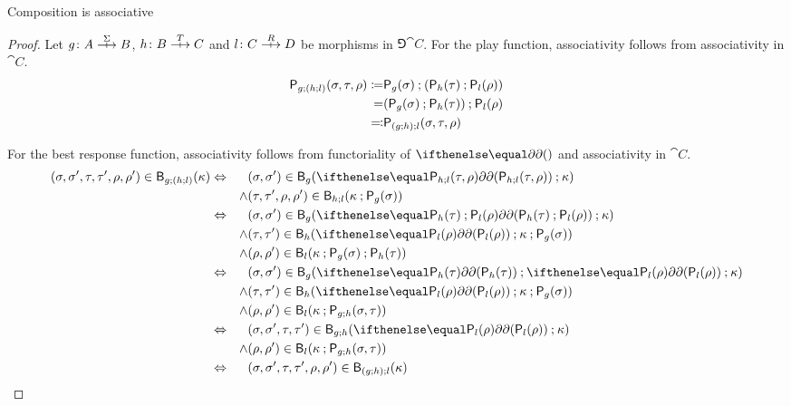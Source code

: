 \begin{lemma}
  Composition is associative
\end{lemma}
\begin{proof}
  Let \(g \colon A \gamearrow{\Sigma} B\), \(h \colon B \gamearrow{T} C\) and \(l \colon C \gamearrow{R} D\) be morphisms in \(\Game{\cat{C}}\).
For the play function, associativity follows from associativity in \(\cat{C}\).
\begin{align*} \play{g \dcomp (h \dcomp l)}(\sigma, \tau, \rho) \defn& \play{g}(\sigma) \dcomp (\play{h}(\tau) \dcomp \play{l}(\rho)) \\
=& (\play{g}(\sigma) \dcomp \play{h}(\tau)) \dcomp \play{l}(\rho) \\
\codefn& \play{(g \dcomp h) \dcomp l}(\sigma, \tau, \rho) \end{align*}

For the best response function, associativity follows from functoriality of \(\delay\) and associativity in \(\cat{C}\).
\begin{align*}(\sigma,\sigma',\tau,\tau',\rho,\rho') \in \best{g \dcomp (h \dcomp l)}(\kappa) \iff& & & (\sigma,\sigma') \in \best{g}(\delay[\play{h \dcomp l}(\tau,\rho)] \dcomp \kappa)\\
& &\land & (\tau,\tau',\rho,\rho') \in \best{h\dcomp l} (\kappa \dcomp \play{g}(\sigma))\\
\iff& & & (\sigma,\sigma') \in \best{g}(\delay[\play{h}(\tau) \dcomp \play{l}(\rho)] \dcomp \kappa)\\
& & \land & (\tau,\tau') \in \best{h}(\delay[\play{l}(\rho)] \dcomp \kappa \dcomp \play{g}(\sigma))\\
& &\land & (\rho,\rho') \in \best{l}(\kappa \dcomp \play{g}(\sigma) \dcomp \play{h}(\tau))\\
\iff& & & (\sigma,\sigma') \in \best{g}(\delay[\play{h}(\tau)] \dcomp \delay[\play{l}(\rho)] \dcomp \kappa)\\
& & \land & (\tau,\tau') \in \best{h}(\delay[\play{l}(\rho)] \dcomp \kappa \dcomp \play{g}(\sigma))\\
& &\land & (\rho,\rho') \in \best{l}(\kappa \dcomp \play{g\dcomp h}(\sigma,\tau))\\
\iff& & & (\sigma,\sigma',\tau,\tau') \in \best{g \dcomp h}(\delay[\play{l}(\rho)] \dcomp \kappa)\\
& &\land & (\rho,\rho') \in \best{l}(\kappa \dcomp \play{g\dcomp h}(\sigma,\tau))\\
\iff & & &(\sigma,\sigma',\tau,\tau',\rho,\rho') \in \best{(g \dcomp h) \dcomp l}(\kappa)
\end{align*}
\end{proof}

